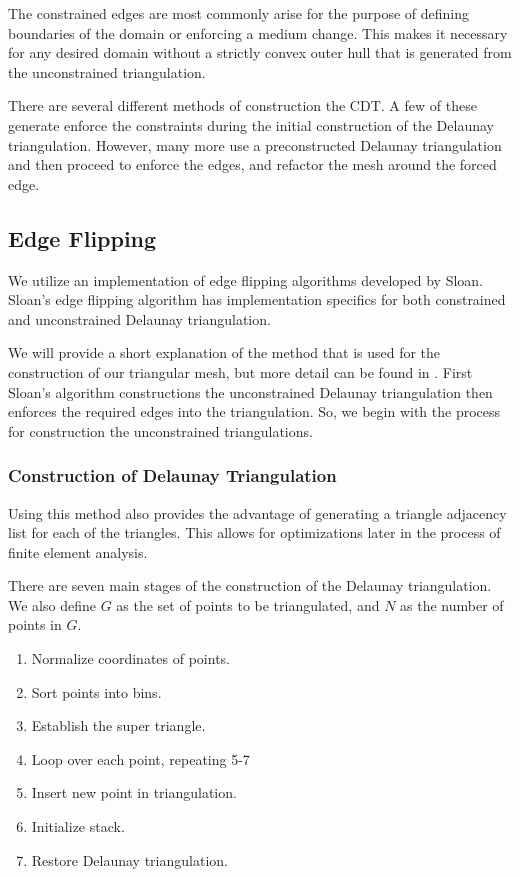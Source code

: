 \documentclass[../fem.tex]{subfiles}
\begin{document}
The constrained edges are most commonly arise for the purpose of defining
boundaries of the domain or enforcing a medium change. This makes it necessary
for any desired domain without a strictly convex outer hull that is generated
from the unconstrained triangulation.

There are several different methods of construction the CDT. A few of these
generate enforce the constraints during the initial construction of the
Delaunay triangulation. However, many more use a preconstructed Delaunay
triangulation and then proceed to enforce the edges, and refactor the mesh
around the forced edge.

\subsection{Edge Flipping}%
\label{sub:edge_flipping}

We utilize an implementation of edge flipping algorithms developed by Sloan.
Sloan's edge flipping algorithm has implementation specifics for both
constrained and unconstrained Delaunay triangulation.

We will provide a short explanation of the method that is used for the
construction of our triangular mesh, but more detail can be found in
\cite{S_DT}\cite{S_CDT}. First Sloan's algorithm constructions the
unconstrained Delaunay triangulation then enforces the required edges into the
triangulation. So, we begin with the process for construction the unconstrained
triangulations.

\subsubsection{Construction of Delaunay Triangulation}%
\label{ssub:construction_of_delaunay_triangulation}

Using this method also provides the advantage of generating a triangle
adjacency list for each of the triangles. This allows for optimizations later
in the process of finite element analysis.

There are seven main stages of the construction of the Delaunay triangulation.
We also define $G$ as the set of points to be triangulated, and $N$ as the
number of points in $G$.

\begin{enumerate}[label=\arabic*.]
  \item Normalize coordinates of points.
  \item Sort points into bins.
  \item Establish the super triangle.
  \item Loop over each point, repeating 5-7
  \item Insert new point in triangulation.
  \item Initialize stack.
  \item Restore Delaunay triangulation.
\end{enumerate}
\end{document}
